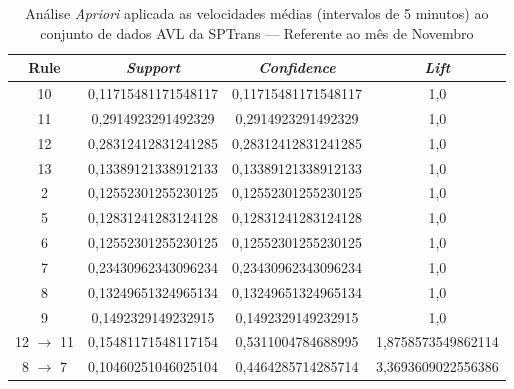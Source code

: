 \documentclass[
	12pt,				%
	oneside,			%
	a4paper,			%
	english,			%
	brazil				%
	]{abntex2ppgsi}
\begin{document}
\begin{apendicesenv}
\begin{table}[!htb]
\centering
\caption {Análise \textit{Apriori} aplicada as velocidades médias (intervalos de 5 minutos) ao conjunto de dados AVL da SPTrans --- Referente ao mês de Novembro}
\label {tab:aprioriNovember}
\begin{tabular}{c|c|c|c}
\hline
\textbf{Rule} & \textit{\textbf{Support}} & \textit{\textbf{Confidence}} & \textit{\textbf{Lift}} \\
\hline
10 &  0,11715481171548117 &  0,11715481171548117 &  1,0\\
\hline
11 &  0,2914923291492329 &  0,2914923291492329 &  1,0\\
\hline
12 &  0,28312412831241285 &  0,28312412831241285 &  1,0\\
\hline
13 &  0,13389121338912133 &  0,13389121338912133 &  1,0\\
\hline
2 &  0,12552301255230125 &  0,12552301255230125 &  1,0\\
\hline
5 &  0,12831241283124128 &  0,12831241283124128 &  1,0\\
\hline
6 &  0,12552301255230125 &  0,12552301255230125 &  1,0\\
\hline
7 &  0,23430962343096234 &  0,23430962343096234 &  1,0\\
\hline
8 &  0,13249651324965134 &  0,13249651324965134 &  1,0\\
\hline
9 &  0,1492329149232915 &  0,1492329149232915 &  1,0\\
\hline
12 $\rightarrow$ 11 &  0,15481171548117154 &  0,5311004784688995 &  1,8758573549862114\\
\hline
8 $\rightarrow$ 7 &  0,10460251046025104 &  0,4464285714285714 &  3,3693609022556386\\
\hline
\end{tabular}
\end{table}



\end{apendicesenv}
\end{document}
